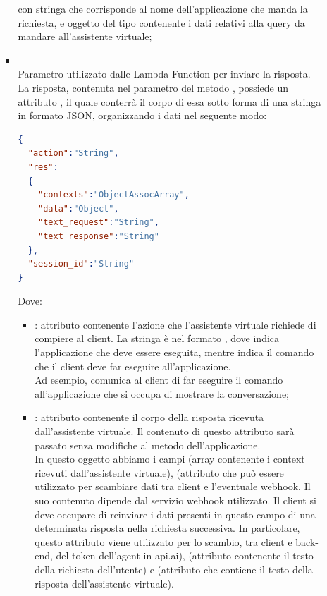 \begin{itemize}
\begin{itemize}
\begin{itemize}
			con  stringa che corrisponde al nome dell'applicazione che manda la richiesta, e  oggetto del tipo  contenente i dati relativi alla query da mandare all'assistente virtuale;
			\item {} \\
			Parametro utilizzato dalle Lambda Function per inviare la risposta. La risposta, contenuta nel  parametro del metodo , possiede un attributo , il quale conterrà il corpo di essa sotto forma di una stringa in formato JSON, organizzando i dati nel seguente modo:
\begin{lstlisting}[language=json,firstnumber=1]
{
  "action":"String",
  "res":
  {
    "contexts":"ObjectAssocArray",
    "data":"Object",
    "text_request":"String",
    "text_response":"String"
  },
  "session_id":"String"
}
\end{lstlisting}
			Dove:
			\begin{itemize}
				\item {}: attributo contenente l'azione che l'assistente virtuale richiede di compiere al client. La stringa è nel formato , dove  indica l'applicazione che deve essere   eseguita, mentre  indica il comando che il client deve far eseguire all'applicazione. \\ Ad esempio,  comunica al client di far eseguire il comando  all'applicazione che si occupa di mostrare la conversazione;
				\item {}: attributo contenente il corpo della risposta ricevuta dall'assistente virtuale. Il contenuto di questo attributo sarà passato senza modifiche al metodo  dell'applicazione.\\ In questo oggetto abbiamo i campi  (array contenente i context ricevuti dall'assistente virtuale),  (attributo che può essere utilizzato per scambiare dati tra client e l'eventuale webhook. Il suo contenuto dipende dal servizio webhook utilizzato. Il client si deve occupare di reinviare i dati presenti in questo campo  di una determinata risposta nella richiesta successiva. In particolare, questo attributo viene utilizzato per lo scambio, tra client e back-end, del token dell'agent in api.ai),  (attributo contenente il testo della richiesta dell'utente) e (attributo che contiene il testo della risposta dell'assistente virtuale).

\end{itemize}
\end{itemize}
\end{itemize}
\end{itemize}
